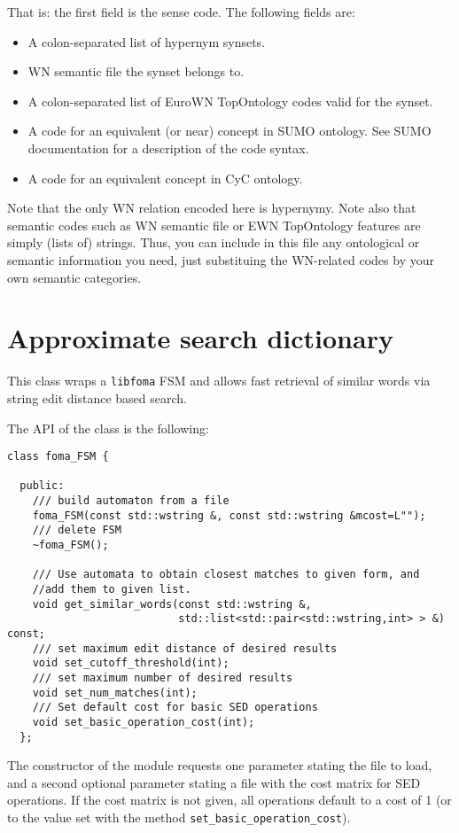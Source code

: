 \documentclass[a4paper]{book}
\begin{document}
 That is: the first field is the sense code.
 The following fields are:
 \begin{itemize}
  \item A colon-separated list of hypernym synsets.
  \item WN semantic file the synset belongs to.
  \item A colon-separated list of EuroWN TopOntology codes valid for the synset.
  \item A code for an equivalent (or near) concept in SUMO ontology.  
        See SUMO documentation for a description of the code syntax.
  \item A code for an equivalent concept in CyC ontology.
  \end{itemize}

  Note that the only WN relation encoded here is hypernymy. Note also that
  semantic codes such as WN semantic file or EWN TopOntology features
  are simply (lists of) strings. Thus, you can include in this file any
  ontological or semantic information you need, just substituing the
  WN-related codes by your own semantic categories.

\section{Approximate search dictionary}
\label{sec-foma}

  This class wraps a \texttt{libfoma} FSM and allows fast retrieval of similar 
words via string edit distance based search.

  The API of the class is the following:
\begin{verbatim}
class foma_FSM {

  public:
    /// build automaton from a file
    foma_FSM(const std::wstring &, const std::wstring &mcost=L""); 
    /// delete FSM
    ~foma_FSM();

    /// Use automata to obtain closest matches to given form, and 
    //add them to given list.
    void get_similar_words(const std::wstring &, 
                           std::list<std::pair<std::wstring,int> > &) const;    
    /// set maximum edit distance of desired results
    void set_cutoff_threshold(int);
    /// set maximum number of desired results
    void set_num_matches(int);
    /// Set default cost for basic SED operations
    void set_basic_operation_cost(int);
  };
\end{verbatim}

  The constructor of the module requests one parameter stating the
  file to load, and a second optional parameter stating a file with
  the cost matrix for SED operations.  If the cost matrix is not 
  given, all operations default to a cost of 1 (or to the value set 
  with the method \verb#set_basic_operation_cost#).
\end{document}
